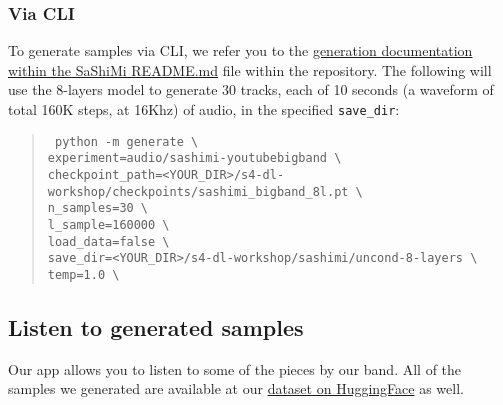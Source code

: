 \documentclass[12pt]{article}
\begin{document}
\subsubsection{Via CLI}
To generate samples via CLI, we refer you to the \href{https://github.com/galbezalel/s4-dl-workshop/tree/main/models/sashimi#audio-generation}{generation documentation within the SaShiMi README.md} file within the repository. The following will use the 8-layers model to generate 30 tracks, each of 10 seconds (a waveform of total 160K steps, at 16Khz) of audio, in the specified \texttt{save\_dir}:
\begin{quote}
\texttt{
    python -m generate \textbackslash \\
    experiment=audio/sashimi-youtubebigband \textbackslash \\
    checkpoint\_path=<YOUR\_DIR>/s4-dl-workshop/checkpoints/sashimi\_bigband\_8l.pt \textbackslash \\  
    n\_samples=30  \textbackslash \\  
    l\_sample=160000 \textbackslash \\
    load\_data=false  \textbackslash \\
    save\_dir=<YOUR\_DIR>/s4-dl-workshop/sashimi/uncond-8-layers \textbackslash \\
    temp=1.0 \textbackslash \\
}
\end{quote}
\subsection{Listen to generated samples}
Our app allows you to listen to some of the pieces by our band. All of the samples we generated are available at our \href{https://huggingface.co/datasets/galbezalel/youtube_bigband/blob/main/generated_samples.zip}{dataset on HuggingFace} as well.


\end{document}
